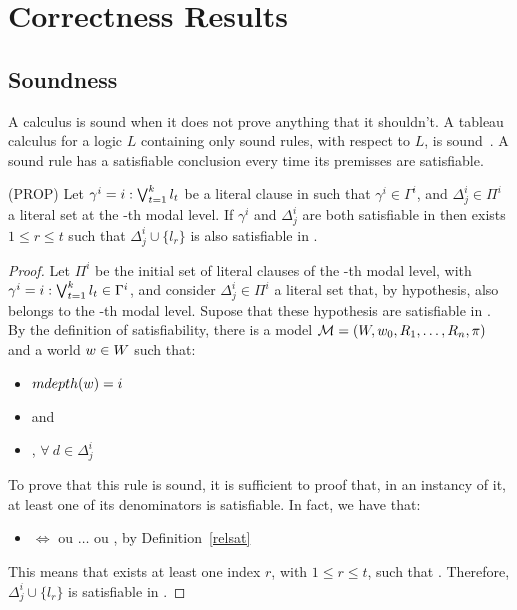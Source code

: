 \section{Correctness Results}
\label{sec:correctnessresults}

\subsection{Soundness}
\label{sec:sound}

A calculus is sound when it does not prove anything that it shouldn't. A tableau
calculus for a logic $L$ containing only sound rules, with respect to $L$, is
sound~\cite{gore2009clausal}. A sound rule has a satisfiable conclusion every
time its premisses are satisfiable.

\begin{lemma}{(PROP)} Let $\gamma^i = i: \bigvee^{k}_{t = 1}l_{t}$ be a literal clause in
     such that $\gamma^i \in \Gamma^i$, and $\Delta^i_j \in \Pi^i$ a
    literal set at the \ml-th modal level. If $\gamma^i$ and $\Delta^i_j$ are
    both satisfiable in  then exists $1 \leq r \leq t$ such that
    $\Delta^i_j \cup \{l_r\}$ is also satisfiable in .
\end{lemma}
\begin{proof}
   Let $\Pi^i$ be the initial set of literal clauses of the \ml-th modal level,
   with $\gamma^i = i: \bigvee^{k}_{t = 1}l_{t} \in \Gamma^i$, and consider $\Delta^i_j \in
   \Pi^i$ a literal set that, by hypothesis, also belongs to the \ml-th modal
   level. Supose that these hypothesis are satisfiable in . By
   the definition of satisfiability, there is a model $\mathcal{M} = (W,
   w_0, R_1, \ldots, R_n, \pi)$ and a world $w \in W$ such that:
   \begin{itemize}
       \item $mdepth(w) = i$ 
       \item {} and
       \item {}, $\forall~d \in \Delta^i_j$
   \end{itemize}
   To prove that this rule is sound, it is sufficient to proof that, in an
   instancy of it, at least one of its denominators is satisfiable. In fact, we
   have that:
   \begin{itemize}
       \item {} $\iff$
            ou $\ldots$ ou , by
           Definition~\ref{relsat}
   \end{itemize}
   This means that exists at least one index $r$, with $1 \leq r \leq t$, such
   that . Therefore, $\Delta^i_j \cup \{l_r\}$ is
   satisfiable in .
\end{proof}

